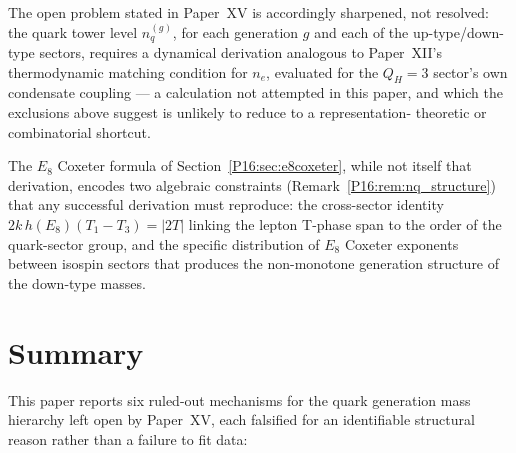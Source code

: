 \documentclass[11pt,a4paper]{article}
\theoremstyle{definition}\newtheorem{definition}[theorem]{Definition}
\theoremstyle{remark}
\theoremstyle{definition}\newtheorem{construction}[theorem]{Construction}
\newcommand{\twoT}{2T}
\newcommand{\QH}{Q_H}
\begin{document}
The open problem stated in Paper~XV is accordingly sharpened, not
resolved: the quark tower level $n_q^{(g)}$, for each generation $g$
and each of the up-type/down-type sectors, requires a dynamical
derivation analogous to Paper~XII's thermodynamic matching condition
for $n_e$, evaluated for the $\QH=3$ sector's own condensate coupling
--- a calculation not attempted in this paper, and which the
exclusions above suggest is unlikely to reduce to a representation-
theoretic or combinatorial shortcut.

The $E_8$ Coxeter formula of Section~\ref{P16:sec:e8coxeter}, while not
itself that derivation, encodes two algebraic constraints
(Remark~\ref{P16:rem:nq_structure}) that any successful derivation must
reproduce: the cross-sector identity $2k\,h(E_8)(T_1-T_3) = |\twoT|$
linking the lepton T-phase span to the order of the quark-sector
group, and the specific distribution of $E_8$ Coxeter exponents
between isospin sectors that produces the non-monotone generation
structure of the down-type masses.

\section{Summary}
\label{P16:sec:summary}

This paper reports six ruled-out mechanisms for the quark generation
mass hierarchy left open by Paper~XV, each falsified for an
identifiable structural reason rather than a failure to fit data:
\end{document}
